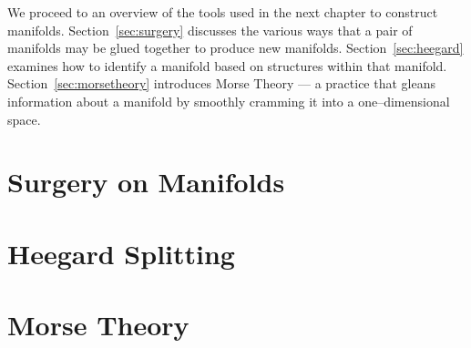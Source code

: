 We proceed to an overview of the tools used in the next chapter to construct manifolds.
Section~\ref{sec:surgery} discusses the various ways that a pair of manifolds may be glued together to produce new manifolds.
Section~\ref{sec:heegard} examines how to identify a manifold based on structures within that manifold.
Section~\ref{sec:morsetheory} introduces Morse Theory --- a practice that gleans information about a manifold by smoothly cramming it into a one--dimensional space.


\section{Surgery on Manifolds}


\section{Heegard Splitting}


\section{Morse Theory}
